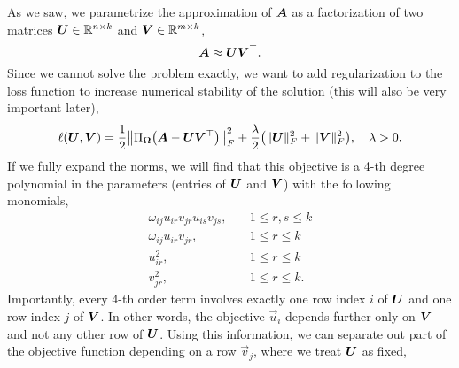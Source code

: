 As we saw, we parametrize the approximation of $\bm{A}$ as a factorization of two matrices
$\bm{U} \in \mathbb{R}^{n \times k}$ and $\bm{V} \in \mathbb{R}^{m \times k}$, \[
    \bm{A} \approx \bm{U} \bm{V}^\top.
\]
Since we cannot solve the problem exactly, we want to add regularization to the loss function to
increase numerical stability of the solution (this will also be very important later), \[
    \ell(\mat{U}, \mat{V}) = \frac{1}{2} \lft\| \Pi_{\mat{\Omega}}\lft( \mat{A} - \mat{U} \transpose{\mat{V}} \rgt) \rgt\|^2_F + \frac{\lambda}{2} \lft( \| \mat{U} \|_F^2 + \| \mat{V} \|_F^2 \rgt), \quad \lambda > 0.
\]
If we fully expand the norms, we will find that this objective is a 4-th degree polynomial in the
parameters (entries of $\bm{U}$ and $\bm{V}$) with the following monomials,
\begin{align*}
    \omega_{ij} u_{ir} v_{jr} u_{is} v_{js}, & \quad 1 \leq r, s \leq k \\
    \omega_{ij} u_{ir} v_{jr},               & \quad 1 \leq r \leq k    \\
    u_{ir}^2,                                & \quad 1 \leq r \leq k    \\
    v_{jr}^2,                                & \quad 1 \leq r \leq k.
\end{align*}
Importantly, every 4-th order term involves exactly one row index $i$ of $\bm{U}$ and one row index
$j$ of $\bm{V}$. In other words, the objective \wrt $\vec{u}_i$ depends further only on $\bm{V}$ and not any
other row of $\bm{U}$. Using this information, we can separate out part of the objective
function depending on a row $\vec{v}_j$, where we treat $\bm{U}$ as fixed,
